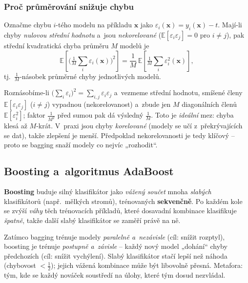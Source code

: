 \subsubsection*{Proč průměrování snižuje chybu}

\begin{veta}
Označme chybu $i$-tého modelu na příkladu $\mathbf{x}$ jako $\varepsilon_i(\mathbf{x})=y_i(\mathbf{x})-t$. Mají-li chyby \emph{nulovou střední hodnotu} a~jsou \emph{nekorelované} ($\mathbb{E}[\varepsilon_i\varepsilon_j]=0$ pro $i\ne j$), pak střední kvadratická chyba průměru $M$ modelů je
\[ \mathbb{E}\!\left[\Big(\tfrac{1}{M}\textstyle\sum_i \varepsilon_i(\mathbf{x})\Big)^2\right] = \frac{1}{M}\,\mathbb{E}\!\left[\tfrac{1}{M}\textstyle\sum_i \varepsilon_i^2(\mathbf{x})\right], \]
tj.\ $\tfrac{1}{M}$-násobek průměrné chyby jednotlivých modelů.
\end{veta}

\begin{intuice}
Roznásobíme-li $\big(\sum_i\varepsilon_i\big)^2=\sum_{i,j}\varepsilon_i\varepsilon_j$ a~vezmeme střední hodnotu, smíšené členy $\mathbb{E}[\varepsilon_i\varepsilon_j]$ ($i\ne j$) vypadnou (nekorelovanost) a~zbude jen $M$ diagonálních členů $\mathbb{E}[\varepsilon_i^2]$; faktor $\tfrac{1}{M^2}$ před sumou pak dá výsledný $\tfrac{1}{M}$. Toto je \emph{ideální} mez: chyba klesá až $M$-krát. V~praxi jsou chyby \emph{korelované} (modely se učí z~překrývajících se dat), takže zlepšení je menší. Předpoklad nekorelovanosti je tedy klíčový -- proto se bagging snaží modely co nejvíc „rozhodit``.
\end{intuice}

\subsection{Boosting a~algoritmus AdaBoost}

\begin{definice}[Boosting]
\textbf{Boosting} buduje silný klasifikátor jako \emph{vážený součet} mnoha \emph{slabých} klasifikátorů (např.\ mělkých stromů), trénovaných \textbf{sekvenčně}. Po každém kole se zvýší \emph{váhy} těch trénovacích příkladů, které dosavadní kombinace klasifikuje \emph{špatně}, takže další slabý klasifikátor se zaměří právě na ně.
\end{definice}

\begin{intuice}
Zatímco bagging trénuje modely \emph{paralelně a~nezávisle} (cíl: snížit rozptyl), boosting je trénuje \emph{postupně a~závisle} -- každý nový model „dohání`` chyby předchozích (cíl: snížit vychýlení). Slabý klasifikátor stačí lepší než náhoda (chybovost $<\tfrac12$); jejich vážená kombinace může být libovolně přesná. Metafora: tým, kde se každý nováček soustředí na úlohy, které tým dosud nezvládal.
\end{intuice}

